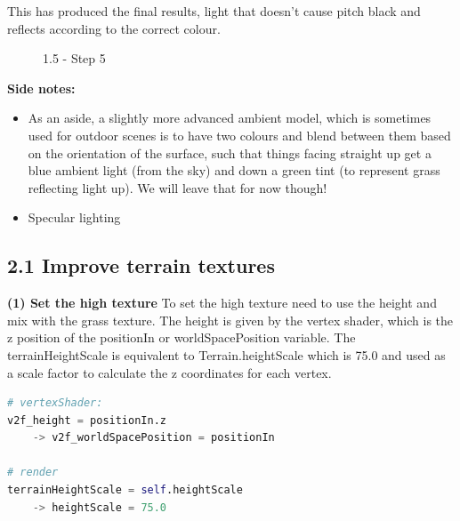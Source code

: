 \documentclass[a4 paper, 12pt]{article}
\begin{document}
This has produced the final results, light that doesn't cause pitch black and reflects according to the correct colour.
    \begin{figure} [H]
        
        \caption{1.5 - Step 5}   
    \end{figure}

\textbf{Side notes:}
    \begin{itemize}
        \item As an aside, a slightly more advanced ambient  model, which is sometimes used for outdoor scenes is to have two colours and blend between
        them based on the orientation of the surface, such that things facing straight up get a blue ambient light (from the sky) and down a green tint (to represent grass reflecting light up). We will leave that for now though!
        \item Specular lighting
    \end{itemize}

\subsection{2.1 Improve terrain textures}

\textbf{(1) Set the high texture}
To set the high texture need to use the height and mix with the grass texture. The height is given by the vertex shader, which is the z position of the positionIn or worldSpacePosition variable. The terrainHeightScale is equivalent to Terrain.heightScale which is 75.0 and used as a scale factor to calculate the z coordinates for each vertex.
    \begin{lstlisting}[language=python]
# vertexShader:
v2f_height = positionIn.z
    -> v2f_worldSpacePosition = positionIn 

# render
terrainHeightScale = self.heightScale 
    -> heightScale = 75.0
    \end{lstlisting}
\end{document}
